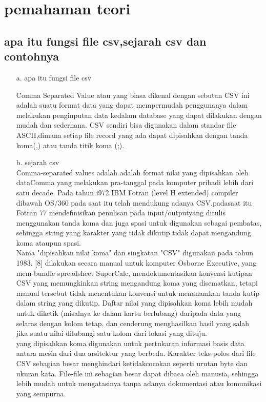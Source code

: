 \chapter{pemahaman teori}
\section{apa itu fungsi file csv,sejarah csv dan contohnya}
\begin{enumerate}
	\item [a.]apa itu fungsi file csv
	        \par Comma Separated Value atau yang biasa dikenal dengan sebutan CSV ini adalah suatu format data yang dapat mempermudah penggunanya dalam melakukan penginputan data kedalam database yang dapat dilakukan dengan mudah dan sederhana. CSV sendiri  bisa digunakan  dalam standar file ASCII,dimana setiap file record yang ada dapat dipisahkan dengan tanda koma(,) atau tanda titik koma (;).
\item [b.]sejarah csv\\
\hspace*{1cm}	Comma-separated values adalah adalah format nilai yang dipisahkan oleh dataComma yang melakukan pra-tanggal pada komputer pribadi lebih dari satu decade. Pada tahun i972 IBM Fotran (level H extended)  compiler dibawah OS/360  pada saat itu telah mendukung adanya CSV.padasaat itu Fotran 77 mendefinisikan penulisan pada input/outputyang ditulis menggunakan tanda koma dan juga spasi untuk digunakan sebagai pembatas, sehingga string yang karakter yang tidak dikutip tidak dapat mengandung koma ataupun spasi.\\
\hspace*{1cm}  Nama "dipisahkan nilai koma" dan singkatan "CSV" digunakan pada tahun 1983. [8]  dilakukan  secara manual untuk komputer Osborne Executive, yang mem-bundle spreadsheet SuperCalc, mendokumentasikan konvensi kutipan CSV yang memungkinkan string mengandung koma yang disematkan, tetapi manual tersebut tidak menentukan konvensi untuk menanamkan tanda kutip dalam string yang dikutip. Daftar nilai yang dipisahkan koma lebih mudah untuk diketik (misalnya ke dalam kartu berlubang) daripada data yang selaras dengan kolom tetap, dan cenderung menghasilkan hasil yang salah jika suatu nilai dilubangi satu kolom dari lokasi yang dituju.\\
\hspace*{1cm} yang dipisahkan koma digunakan untuk pertukaran informasi basis data antara mesin dari dua arsitektur yang berbeda. Karakter teks-polos dari file CSV sebagian besar menghindari ketidakcocokan seperti urutan byte dan ukuran kata. File-file ini sebagian besar dapat dibaca oleh manusia, sehingga lebih mudah untuk mengatasinya tanpa adanya dokumentasi atau komunikasi yang sempurna. 

\end{enumerate}
